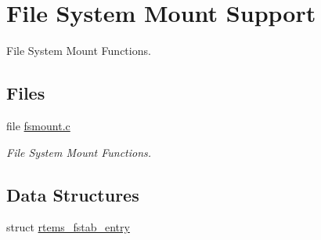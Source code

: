 \hypertarget{group__rtems__fstab}{}\section{File System Mount Support}
\label{group__rtems__fstab}


File System Mount Functions.  


\subsection*{Files}
\begin{DoxyCompactItemize}
\item 
file \mbox{\hyperlink{fsmount_8c}{fsmount.\+c}}
\begin{DoxyCompactList}\small\item\em File System Mount Functions. \end{DoxyCompactList}\end{DoxyCompactItemize}
\subsection*{Data Structures}
\begin{DoxyCompactItemize}
\item 
struct \mbox{\hyperlink{structrtems__fstab__entry}{rtems\+\_\+fstab\+\_\+entry}}
\end{DoxyCompactItemize}
